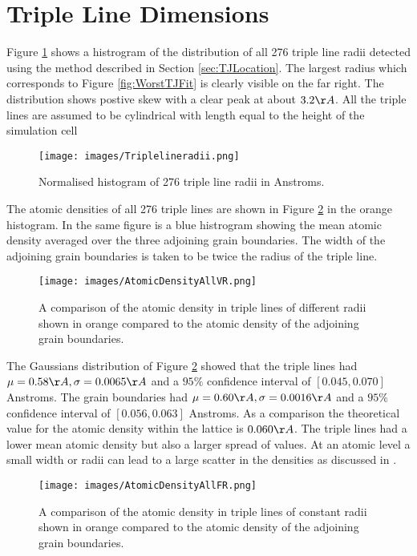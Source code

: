 \documentclass[12pt,a4paper]{book}
\begin{document}
\newpage
\section{Triple Line Dimensions}

Figure \ref{fig:TJRadii} shows a histrogram of the distribution of all 276 triple line radii detected using the method described in Section \ref{sec:TJLocation}. The largest radius which corresponds to Figure \ref{fig:WorstTJFit} is clearly visible on the far right. The distribution shows postive skew with a clear peak at about $3.2 \AA$. All the triple lines are assumed to be cylindrical with length equal to the height of the simulation cell

\begin{figure}[H]
	\texttt{[image: images/Triplelineradii.png]}  
	\caption{Normalised histogram of 276 triple line radii in Anstroms.}	
	\label{fig:TJRadii}
\end{figure}	

The atomic densities of all 276 triple lines are shown in Figure \ref{fig:AtomicDensityVR} in the orange histogram. In the same figure is a blue histrogram showing the mean atomic density averaged over the three adjoining grain boundaries. The width of the adjoining grain boundaries is taken to be twice the radius of the triple line. 

\begin{figure}[H]
	\centering
	\texttt{[image: images/AtomicDensityAllVR.png]}
	\label{fig:AtomicDensityVR} 
	\caption{A comparison of the atomic density in triple lines of different radii shown in orange compared to the atomic density of the adjoining grain boundaries.}
\end{figure}

The Gaussians distribution of Figure \ref{fig:AtomicDensityVR}  showed that the triple lines had $\mu = 0.58 \AA, \sigma = 0.0065 \AA $ and a $95\%$ confidence interval of $[0.045, 0.070]$ Anstroms. The grain boundaries had $\mu = 0.60 \AA, \sigma = 0.0016 \AA $ and a $95\%$ confidence interval of $[0.056, 0.063]$ Anstroms. As a comparison the theoretical value for the atomic density within the lattice is
$0.060 \AA$. The triple lines had a lower mean atomic density but also a larger spread of values. At an atomic level a small width or radii can lead to a large scatter in the densities as discussed in \cite{Kamachali2019}.  
 



\begin{figure}[H]
	\centering
	\texttt{[image: images/AtomicDensityAllFR.png]} 
	\label{fig:AtomicDensityFR}	
	\caption{A comparison of the atomic density in triple lines of constant radii shown in orange compared to the atomic density of the adjoining grain boundaries.}
\end{figure}
\end{document}
